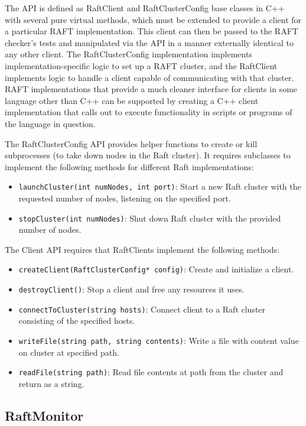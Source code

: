 \documentclass[UTF8]{article}
\begin{document}
The API is defined as RaftClient and RaftClusterConfig base classes in C++ with several pure virtual methods, which must be extended to provide a client for a particular RAFT implementation. This client can then be passed to the RAFT checker's tests and manipulated via the API in a manner externally identical to any other client. The RaftClusterConfig implementation implements implementation-specific logic to set up a RAFT cluster, and the RaftClient implements logic to handle a client capable of communicating with that cluster. RAFT implementations that provide a much cleaner interface for clients in some language other than C++ can be supported by creating a C++ client implementation that calls out to execute functionality in scripts or programs of the language in question.

The RaftClusterConfig API provides helper functions to create or kill subprocesses (to take down nodes in the Raft cluster). It requires subclasses to implement the following methods for different Raft implementations:

\begin{itemize}
\item \texttt{launchCluster(int numNodes, int port)}: Start a new Raft cluster with the requested number of nodes, listening on the specified port.
\item \texttt{stopCluster(int numNodes)}: Shut down Raft cluster with the provided number of nodes.
\end{itemize}

The Client API requires that RaftClients implement the following methods:

\begin{itemize}
\item \texttt{createClient(RaftClusterConfig* config)}: Create and initialize a client.
\item \texttt{destroyClient()}: Stop a client and free any resources it uses.
\item \texttt{connectToCluster(string hosts)}: Connect client to a Raft cluster consisting of the specified hosts.
\item \texttt{writeFile(string path, string contents)}: Write a file with content value on cluster at specified path.
\item \texttt{readFile(string path)}: Read file contents at path from the cluster and return as a string.
\end{itemize}

\subsection{RaftMonitor}
\end{document}
